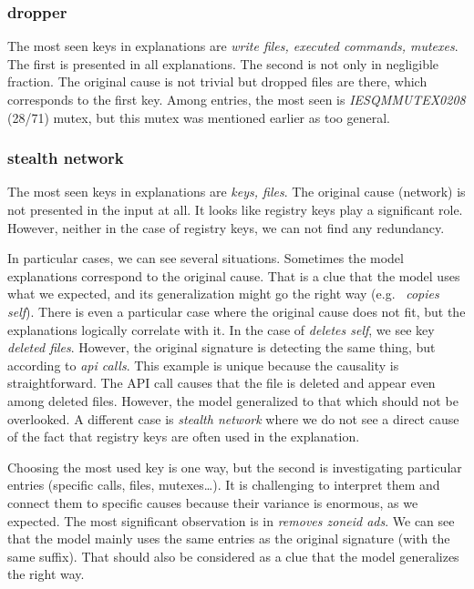\subsubsection*{dropper}
The most seen keys in explanations are \emph{write files, executed commands, mutexes}. The first is presented in all explanations. The second is not only in negligible fraction. The original cause is not trivial but dropped files are there, which corresponds to the first key. Among entries, the most seen is \emph{IESQMMUTEX0208} (28/71) mutex, but this mutex was mentioned earlier as too general.

\subsubsection*{stealth network}
The most seen keys in explanations are \emph{keys, files}. The original cause (network) is not presented in the input at all. It looks like registry keys play a significant role. However, neither in the case of registry keys, we can not find any redundancy.

\hfill \break

In particular cases, we can see several situations. Sometimes the model explanations correspond to the original cause. That is a clue that the model uses what we expected, and its generalization might go the right way (e.g. \ \emph{copies self}). There is even a particular case where the original cause does not fit, but the explanations logically correlate with it. In the case of \emph{deletes self}, we see key \emph{deleted files}. However, the original signature is detecting the same thing, but according to \emph{api calls}. This example is unique because the causality is straightforward. The API call causes that the file is deleted and appear even among deleted files. However, the model generalized to that which should not be overlooked. A different case is \emph{stealth network} where we do not see a direct cause of the fact that registry keys are often used in the explanation.

Choosing the most used key is one way, but the second is investigating particular entries (specific calls, files, mutexes\dots). It is challenging to interpret them and connect them to specific causes because their variance is enormous, as we expected. The most significant observation is in \emph{removes zoneid ads}. We can see that the model mainly uses the same entries as the original signature (with the same suffix). That should also be considered as a clue that the model generalizes the right way.

